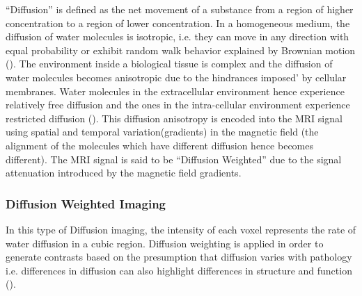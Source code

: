 \documentclass[msthesis.tex]{subfiles}
\begin{document}
“Diffusion” is defined as the net movement of a substance from a region of higher concentration to a region of lower concentration. In a homogeneous medium, the diffusion of water molecules is isotropic, i.e. they can move in any direction with equal probability or exhibit random walk behavior explained by Brownian motion (\cite{Brogioli_2000}).
The environment inside a biological tissue is complex and the diffusion of water molecules becomes anisotropic due to the hindrances imposed’ by cellular membranes. Water molecules in the extracellular environment hence experience relatively free diffusion and the ones in the intra-cellular environment experience restricted diffusion (\cite{toennies2017guide}). This diffusion anisotropy is encoded into the MRI signal using spatial and temporal variation(gradients) in the magnetic field (the alignment of the molecules which have different diffusion hence becomes different). The MRI signal is said to be “Diffusion Weighted” due to the signal attenuation introduced by the magnetic field gradients. 


\subsubsection{Diffusion Weighted Imaging}
\label{DWI}
In this type of Diffusion imaging, the intensity of each voxel represents the rate of water diffusion in a cubic region. Diffusion weighting is applied in order to generate contrasts based on the presumption that diffusion varies with pathology i.e. differences in diffusion can also highlight differences in structure and function (\cite{Taylor_1985}). 
\end{document}
